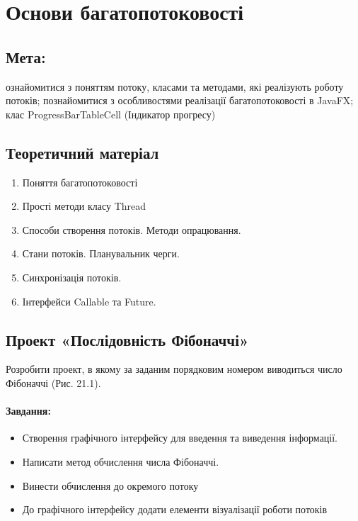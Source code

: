 \section{Основи багатопотоковості}

\subsection{Мета:}
ознайомитися з поняттям потоку, класами та методами, які реалізують роботу потоків;
познайомитися з особливостями реалізації багатопотоковості в JavaFX; клас ProgressBarTableCell (Індикатор прогресу)

\subsection{Теоретичний матеріал}

\begin{enumerate}
	\item Поняття багатопотоковості
	\item Прості методи класу Thread
	\item Способи створення потоків. Методи опрацювання.
	\item Стани потоків. Планувальник черги.
	\item Синхронізація потоків.
	\item Інтерфейси Callable та Future.
\end{enumerate}

\subsection{Проект «Послідовність Фібоначчі»}
Розробити проект, в якому за заданим порядковим номером виводиться число Фібоначчі (Рис. 21.1).

\paragraph{Завдання:}
\begin{itemize}
	\item Створення графічного інтерфейсу для введення та виведення інформації.
	\item Написати метод обчислення числа Фібоначчі.
	\item Винести обчислення до окремого потоку
	\item До графічного інтерфейсу додати елементи візуалізації роботи потоків
\end{itemize}

